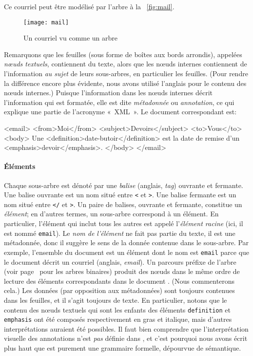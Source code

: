 \bigskip

\noindent Ce courriel peut être modélisé par l'arbre à la
\fig~\vref{fig:mail}.
\begin{figure}[b]
\begin{center}
\texttt{[image: mail]}
\caption{Un courriel vu comme un arbre \XML\label{fig:mail}}
\end{center}
\end{figure}
Remarquons que les feuilles (sous forme de boîtes aux bords arrondis),
appelées \emph{n{\oe}uds textuels}, contiennent du texte, alors que
les n{\oe}uds internes contiennent de l'information \emph{au sujet} de
leurs sous-arbres, en particulier les feuilles. (Pour rendre la
différence encore plus évidente, nous avons utilisé l'anglais pour le
contenu des n{\oe}uds internes.) Puisque l'information dans les
n{\oe}uds internes décrit l'information qui est formatée, elle est
dite \emph{métadonnée} ou \emph{annotation}, ce qui explique une
partie de l'acronyme «~\textsf{XML}~». Le document \XML correspondant
est:
\begin{sverb}
<email>
  <from>Moi</from>
  <subject>Devoirs</subject>
  <to>Vous</to>
  <body>
  Une <definition>date-butoir</definition> est la date de remise
d'un <emphasis>devoir</emphasis>.
  </body>
</email>
\end{sverb}

\paragraph{Éléments}

Chaque sous-arbre est dénoté par une \emph{balise} (anglais,
\emph{tag}) ouvrante et fermante. Une balise ouvrante est un nom situé
entre \texttt{<} et \texttt{>}. Une balise fermante est un nom situé
entre \texttt{</} et \texttt{>}. Un paire de balises, ouvrante et
fermante, constitue un \emph{élément}; en d'autres termes, un
sous-arbre correspond à un élément. En particulier, l'élément qui
inclut tous les autres est appelé l'\emph{élément racine} (ici, il est
nommé \texttt{email}). Le \emph{nom de l'élément} ne fait pas partie
du texte, il est une métadonnée, donc il suggère le sens de la donnée
contenue dans le sous-arbre. Par exemple, l'ensemble du document \XML
est un élément dont le nom est \texttt{email} parce que le document
décrit un courriel (anglais, \emph{email}). Un parcours préfixe de
l'arbre \XML (voir page~\pageref{preorder} pour les arbres binaires)
produit des n{\oe}uds dans le même ordre de lecture des éléments
correspondants dans le document \XML. (Nous commenterons cela.) Les
données (par opposition aux métadonnées) sont toujours contenues dans
les feuilles, et il s'agit toujours de texte. En particulier, notons
que le contenu des n{\oe}uds textuels qui sont les enfants des
éléments \texttt{definition} et \texttt{emphasis} ont été composés
respectivement en gras et italique, mais d'autres interprétations
auraient été possibles. Il faut bien comprendre que l'interprétation
visuelle des annotations n'est \emph{pas} définie dans \XML, et c'est
pourquoi nous avons écrit plus haut que \XML est purement une
grammaire formelle, dépourvue de sémantique.

